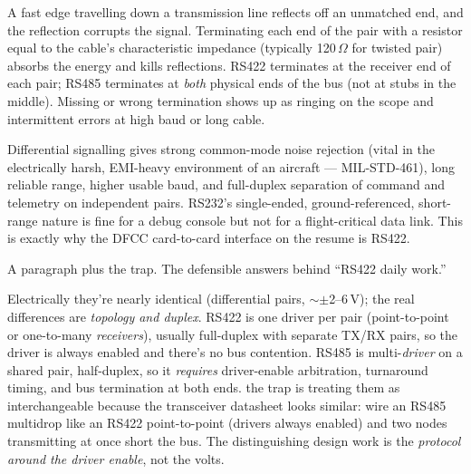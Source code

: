 A fast edge travelling down a transmission line reflects off an unmatched end,
and the reflection corrupts the signal. Terminating each end of the pair with a
resistor equal to the cable's characteristic impedance (typically 120\,$\Omega$
for twisted pair) absorbs the energy and kills reflections. RS422 terminates at
the receiver end of each pair; RS485 terminates at \emph{both} physical ends of
the bus (not at stubs in the middle). Missing or wrong termination shows up as
ringing on the scope and intermittent errors at high baud or long cable.

Differential signalling gives strong common-mode noise rejection (vital in the
electrically harsh, EMI-heavy environment of an aircraft --- MIL-STD-461),
long reliable range, higher usable baud, and full-duplex separation of command
and telemetry on independent pairs. RS232's single-ended, ground-referenced,
short-range nature is fine for a debug console but not for a flight-critical
data link. This is exactly why the DFCC card-to-card interface on the resume is
RS422.

%
{A paragraph plus the trap. The defensible answers behind ``RS422 daily work.''}

Electrically they're nearly identical (differential pairs, $\sim\pm$2--6\,V);
the real differences are \emph{topology and duplex}. RS422 is one driver per
pair (point-to-point or one-to-many \emph{receivers}), usually full-duplex with
separate TX/RX pairs, so the driver is always enabled and there's no bus
contention. RS485 is multi-\emph{driver} on a shared pair, half-duplex, so it
\emph{requires} driver-enable arbitration, turnaround timing, and bus
termination at both ends. \trap the trap is treating them as interchangeable
because the transceiver datasheet looks similar: wire an RS485 multidrop like an
RS422 point-to-point (drivers always enabled) and two nodes transmitting at
once short the bus. The distinguishing design work is the \emph{protocol around
the driver enable}, not the volts.

